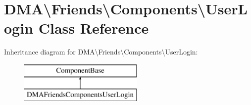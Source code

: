 \hypertarget{classDMA_1_1Friends_1_1Components_1_1UserLogin}{}\section{D\+M\+A\textbackslash{}Friends\textbackslash{}Components\textbackslash{}User\+Login Class Reference}
\label{classDMA_1_1Friends_1_1Components_1_1UserLogin}
Inheritance diagram for D\+M\+A\textbackslash{}Friends\textbackslash{}Components\textbackslash{}User\+Login\+:\begin{figure}[H]
\begin{center}
\leavevmode
\includegraphics[height=2.000000cm]{df/d81/classDMA_1_1Friends_1_1Components_1_1UserLogin}
\end{center}
\end{figure}
